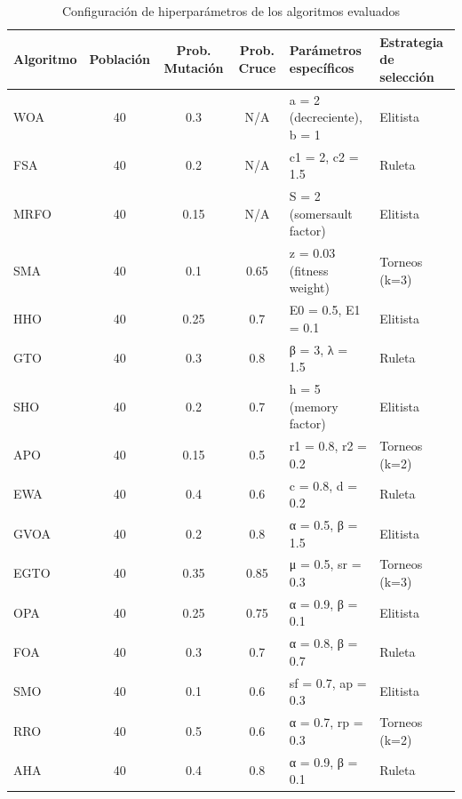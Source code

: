 \documentclass[10pt,a4paper]{extarticle}
\begin{document}
\begin{table}[!htbp]
  \centering
  \caption{Configuración de hiperparámetros de los algoritmos evaluados}
  \label{tab:hyperparams}
  \small
  \begin{tabular}{lcccll}
    \toprule
    \textbf{Algoritmo} & \textbf{Población} & \textbf{Prob. Mutación} & \textbf{Prob. Cruce} & \textbf{Parámetros específicos} & \textbf{Estrategia de selección} \\
    \midrule
    WOA & 40 & 0.3 & N/A & a = 2 (decreciente), b = 1 & Elitista \\
    FSA & 40 & 0.2 & N/A & c1 = 2, c2 = 1.5 & Ruleta \\
    MRFO & 40 & 0.15 & N/A & S = 2 (somersault factor) & Elitista \\
    SMA & 40 & 0.1 & 0.65 & z = 0.03 (fitness weight) & Torneos (k=3) \\
    HHO & 40 & 0.25 & 0.7 & E0 = 0.5, E1 = 0.1 & Elitista \\
    GTO & 40 & 0.3 & 0.8 & β = 3, λ = 1.5 & Ruleta \\
    SHO & 40 & 0.2 & 0.7 & h = 5 (memory factor) & Elitista \\
    APO & 40 & 0.15 & 0.5 & r1 = 0.8, r2 = 0.2 & Torneos (k=2) \\
    EWA & 40 & 0.4 & 0.6 & c = 0.8, d = 0.2 & Ruleta \\
    GVOA & 40 & 0.2 & 0.8 & α = 0.5, β = 1.5 & Elitista \\
    EGTO & 40 & 0.35 & 0.85 & μ = 0.5, sr = 0.3 & Torneos (k=3) \\
    OPA & 40 & 0.25 & 0.75 & α = 0.9, β = 0.1 & Elitista \\
    FOA & 40 & 0.3 & 0.7 & α = 0.8, β = 0.7 & Ruleta \\
    SMO & 40 & 0.1 & 0.6 & sf = 0.7, ap = 0.3 & Elitista \\
    RRO & 40 & 0.5 & 0.6 & α = 0.7, rp = 0.3 & Torneos (k=2) \\
    AHA & 40 & 0.4 & 0.8 & α = 0.9, β = 0.1 & Ruleta \\
    \bottomrule
  \end{tabular}
\end{table}
\end{document}
